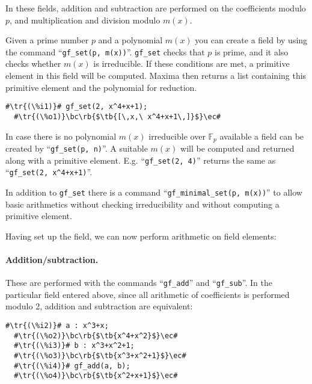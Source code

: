 \documentclass[a4paper,11pt,leqno,fleqn]{artikel3}
\newcommand{\bc}{\begin{center}}
\newcommand{\ec}{\end{center}}
\newcommand{\tr}[1]{\textcolor{red}{#1}}
\newcommand{\tb}[1]{\textcolor{blue}{#1}}
\newcommand{\rb}[1]{\raisebox{2mm}[0mm][1mm]{#1}}
\begin{document}
In these fields, addition and subtraction are performed on the coefficients
modulo $p$, and multiplication and division modulo $m(x)$.

Given a prime number $p$ and a polynomial $m(x)$ 
you can create a field by using the command ``\verb!gf_set(p, m(x))!''.
\verb!gf_set! checks that $p$ is prime, and it also checks 
whether $m(x)$ is irreducible. If these conditions are met, 
a primitive element in this field will be computed. 
Maxima then returns a list containing this primitive element and the 
polynomial for reduction.

%
\vspace*{2mm}
\begin{lstlisting}[escapechar=\#]
  #\tr{(\%i1)}# gf_set(2, x^4+x+1);
  #\tr{(\%o1)}\bc\rb{$\tb{[\,x,\ x^4+x+1\,]}$}\ec#
\end{lstlisting}

In case there is no polynomial $m(x)$ irreducible over $\mathbb{F}_p$ available 
a field can be created by ``\verb!gf_set(p, n)!''. 
A suitable $m(x)$ will be computed and returned along with a primitive element. 
E.g. ``\verb!gf_set(2, 4)!'' returns the same as ``\verb!gf_set(2, x^4+x+1)!''.

In addition to \verb!gf_set! there is a command ``\verb!gf_minimal_set(p, m(x))!'' 
to allow basic arithmetics without checking irreducibility and 
without computing a primitive element.


\bigskip

Having set up the field, we can now perform arithmetic on field elements:


\paragraph{Addition/subtraction.}

These are performed with the commands ``\verb!gf_add!'' and ``\verb!gf_sub!''.
In the particular field entered above, since all arithmetic of coefficients is
performed modulo 2, addition and subtraction are equivalent:

\vspace*{2mm}
\begin{lstlisting}[escapechar=\#]
  #\tr{(\%i2)}# a : x^3+x;
  #\tr{(\%o2)}\bc\rb{$\tb{x^4+x^2}$}\ec#
  #\tr{(\%i3)}# b : x^3+x^2+1;
  #\tr{(\%o3)}\bc\rb{$\tb{x^3+x^2+1}$}\ec#
  #\tr{(\%i4)}# gf_add(a, b);
  #\tr{(\%o4)}\bc\rb{$\tb{x^2+x+1}$}\ec#
\end{lstlisting}
\end{document}
